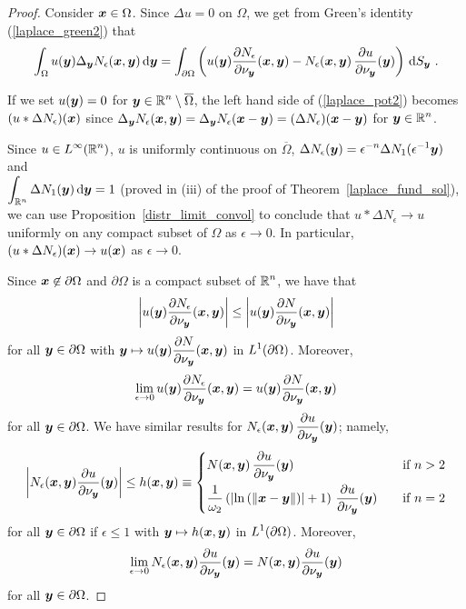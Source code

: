 \begin{proof}
Consider ${\bm{x}} \in \Omega$.
Since $\Delta u = 0$ on $\Omega$, we get from Green's identity
(\ref{laplace_green2}) that
\begin{equation} \label{laplace_pot2}
\int_{\Omega} u({\bm{y}}) \Delta_{{\bm{y}}}
N_{\epsilon}({\bm{x}},{\bm{y}}) \,\mathrm{d}{{\bm{y}}}
= \int_{\partial \Omega} \left( u({\bm{y}})
\frac{\partial{N_{\epsilon}}}{\partial \nu_{{\bm{y}}}}({\bm{x}},{\bm{y}}) -
N_{\epsilon}({\bm{x}},{\bm{y}}) \,
\frac{\partial{u}}{\partial \nu_{{\bm{y}}}}({\bm{y}})\right) \,\mathrm{d}{S}_{{\bm{y}}} \ .
\end{equation}

If we set $u({\bm{y}}) = 0$ for
$\displaystyle {\bm{y}} \in \mathbb{R}^n \setminus \overline{\Omega}$,
the left hand side of (\ref{laplace_pot2}) becomes
$(u \ast \Delta N_\epsilon)({\bm{x}})$ since
$\displaystyle \Delta_{{\bm{y}}} N_{\epsilon}({\bm{x}},{\bm{y}})
= \Delta_{{\bm{y}}} N_{\epsilon}({\bm{x}} - {\bm{y}}) =
(\Delta N_\epsilon)({\bm{x}}-{\bm{y}})$ for
$\displaystyle {\bm{y}} \in \mathbb{R}^n$.

Since $\displaystyle u \in L^\infty(\mathbb{R}^n)$, $u$ is uniformly
continuous on $\overline{\Omega}$, 
$\displaystyle \Delta N_\epsilon({\bm{y}}) =
\epsilon^{-n}\Delta N_1(\epsilon^{-1}{\bm{y}})$ and\\
$\displaystyle \int_{\mathbb{R}^n} \Delta N_1({\bm{y}}) \,\mathrm{d}{{\bm{y}}} = 1$
(proved in (iii) of the proof of
Theorem~\ref{laplace_fund_sol}), we can use
Proposition~\ref{distr_limit_convol} to conclude that
$u \ast \Delta N_\epsilon \rightarrow u$ uniformly on any compact
subset of $\Omega$ as $\epsilon \rightarrow 0$.  In particular,
$(u \ast \Delta N_\epsilon)({\bm{x}}) \rightarrow u({\bm{x}})$ as
$\epsilon \rightarrow 0$.

Since ${\bm{x}} \not\in \partial \Omega$ and $\partial \Omega$ is a
compact subset of $\displaystyle \mathbb{R}^n$, we have that
\[
\left| u({\bm{y}})
\frac{\partial{N_{\epsilon}}}{\partial \nu_{{\bm{y}}}}({\bm{x}},{\bm{y}}) \right|
\leq \left| u({\bm{y}}) \frac{\partial{N}}{\partial \nu_{{\bm{y}}}}({\bm{x}},{\bm{y}}) \right|
\]
for all ${\bm{y}} \in \partial \Omega$ with
$\displaystyle {\bm{y}}\mapsto u({\bm{y}})
\frac{\partial{N}}{\partial \nu_{{\bm{y}}}}({\bm{x}},{\bm{y}})$ in
$\displaystyle L^1(\partial \Omega)$.
Moreover,
\[
\lim_{\epsilon \rightarrow 0}
u({\bm{y}}) \frac{\partial{N_{\epsilon}}}{\partial \nu_{{\bm{y}}}}({\bm{x}},{\bm{y}})
= u({\bm{y}}) \frac{\partial{N}}{\partial \nu_{{\bm{y}}}}({\bm{x}},{\bm{y}})
\]
for all ${\bm{y}} \in \partial \Omega$.  We have similar results for 
$\displaystyle N_{\epsilon}({\bm{x}},{\bm{y}})
\, \frac{\partial{u}}{\partial \nu_{{\bm{y}}}}({\bm{y}})$; namely,
\[
\left| N_{\epsilon}({\bm{x}},{\bm{y}})
\frac{\partial{u}}{\partial \nu_{{\bm{y}}}}({\bm{y}}) \right|
\leq h({\bm{x}},{\bm{y}})
\equiv
\begin{cases}
\displaystyle N({\bm{x}},{\bm{y}})
\, \frac{\partial{u}}{\partial \nu_{{\bm{y}}}}({\bm{y}}) & \quad \text{if} \ n > 2 \\[0.8em]
\displaystyle
\frac{1}{\omega_2} \left( \left|\ln\left(\|{\bm{x}}- {\bm{y}}\|\right)\right|
+1 \right) \, \frac{\partial{u}}{\partial \nu_{{\bm{y}}}}({\bm{y}}) & \quad
\text{if} \ n = 2
\end{cases}
\]
for all ${\bm{y}} \in \partial \Omega$ if $\epsilon \leq 1$ with
$\displaystyle {\bm{y}}\mapsto h({\bm{x}},{\bm{y}})$ in
$\displaystyle L^1(\partial \Omega)$.
Moreover,
\[
\lim_{\epsilon \rightarrow 0}
N_{\epsilon}({\bm{x}},{\bm{y}})
\frac{\partial{u}}{\partial \nu_{{\bm{y}}}}({\bm{y}})
= N({\bm{x}},{\bm{y}})
\frac{\partial{u}}{\partial \nu_{{\bm{y}}}}({\bm{y}})
\]
for all ${\bm{y}} \in \partial \Omega$.


\end{proof}
